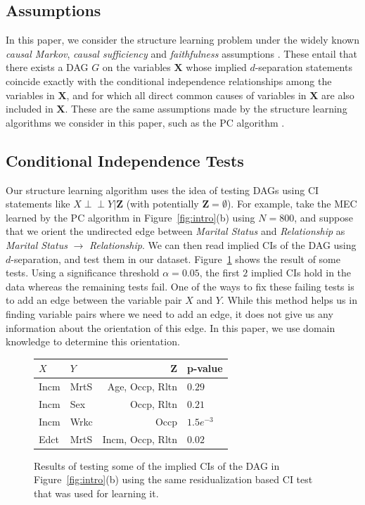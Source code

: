 \documentclass[accepted]{uai2025} %
\def\ci{\perp\!\!\!\!\perp}
\begin{document}
\subsection{Assumptions} 
In this paper, we consider the structure learning problem under the widely
known \emph{causal Markov}, \emph{causal sufficiency} and \emph{faithfulness}
assumptions \citep{Spirtes1993}. These entail that there exists a 
DAG $G$ on the variables $\bm{X}$ whose implied $d$-separation statements coincide
exactly with the conditional independence relationships among the variables 
in $\bm{X}$, and for which all direct common causes of variables in $\bm{X}$ are 
also included in $\bm{X}$. These are the same assumptions made by the structure
learning algorithms we consider in this paper, such as the PC algorithm \citep{Spirtes1993}.

\subsection{Conditional Independence Tests}
\label{sec:ci_tests}
Our structure learning algorithm uses the idea of testing DAGs using CI statements
like $ X \ci Y \rvert \bm{Z} $ (with
potentially $ \bm{Z} = \emptyset $).
For example, take the MEC learned by the PC algorithm in
Figure~\ref{fig:intro}(b) using $ N=800 $, and suppose that we orient 
the undirected edge between \emph{Marital Status} and
\emph{Relationship}  as \emph{Marital Status} $ \rightarrow $
\emph{Relationship}. We can then read implied CIs of the DAG using $d$-separation,
and test them in our dataset. Figure~\ref{fig:ci_table} shows the result of some tests. 
Using a significance threshold  $\alpha=0.05 $, the first $ 2 $
implied CIs hold in the data whereas the remaining tests fail. One of the ways
to fix these failing tests is to add an edge between the variable pair $ X $
and $ Y $. While this method helps us in finding variable pairs where we need
to add an edge, it does not give us any information about the orientation of
this edge. In this paper, we use domain knowledge to determine this
orientation.

\begin{figure}
	\centering
	\begin{tabular}{llrl}
		$X$ & $Y$ & $ \bm{Z} $ & p-value \\
		\hline
		Incm & MrtS &  Age, Occp, Rltn & $ 0.29 $     \\
		Incm & Sex  &  Occp, Rltn      & $ 0.21 $     \\
		Incm & Wrkc &  Occp 	       & $ 1.5e^{-3} $ \\
		Edct & MrtS & Incm, Occp, Rltn & $ 0.02 $       \\
		\hline
	\end{tabular}
	\caption{Results of testing some of the implied CIs of the DAG in
		 Figure~\ref{fig:intro}(b) using the same residualization based
	 	 CI test that was used for learning it.}
	\label{fig:ci_table}
\end{figure}
\end{document}
